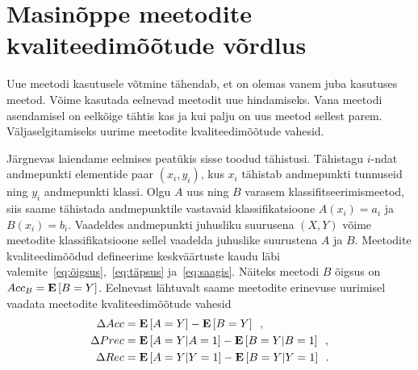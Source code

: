 \section{Masinõppe meetodite kvaliteedimõõtude võrdlus}
Uue meetodi kasutusele võtmine tähendab, et on olemas vanem juba kasutuses meetod. Võime kasutada eelnevad meetodit uue hindamiseks. Vana meetodi asendamisel on eelkõige tähtis kas ja kui palju on uus meetod sellest parem. Väljaselgitamiseks uurime meetodite kvaliteedimõõtude vahesid.

Järgnevas laiendame eelmises peatükis sisse toodud tähistusi. Tähistagu $i$-ndat andmepunkti elementide paar $(x_i, y_i)$, kus $x_i$ tähistab andmepunkti tunnuseid ning $y_i$ andmepunkti klassi. Olgu $A$ uus ning $B$ varasem klassifitseerimismeetod, siis saame tähistada andmepunktile vastavaid klassifikatsioone  $A(x_i) = a_i$ ja $B(x_i) = b_i$. Vaadeldes andmepunkti juhusliku suurusena $(X, Y)$ võime meetodite klassifikatsioone sellel vaadelda juhuslike suurustena $A$ ja $B$. Meetodite kvaliteedimõõdud defineerime keskväärtuste kaudu läbi valemite~\eqref{eq:õigsus},~\eqref{eq:täpsus} ja~\eqref{eq:saagis}. Näiteks meetodi $B$ õigsus on $Acc_B = \operatorname*{\mathbf{E}}\left[B = Y\right]$. Eelnevast lähtuvalt saame meetodite erinevuse uurimisel vaadata meetodite kvaliteedimõõtude vahesid
\begin{align}
    \Delta Acc &= \operatorname*{\mathbf{E}}\left[A = Y\right] - \operatorname*{\mathbf{E}}\left[B = Y\right] \enspace, \label{eq:õigsus vahe} \\
    \Delta Prec &= \operatorname*{\mathbf{E}}\left[A = Y | A = 1\right] - \operatorname*{\mathbf{E}}\left[B = Y | B = 1\right] \enspace, \label{eq:täpsus vahe} \\
    \Delta Rec &= \operatorname*{\mathbf{E}}\left[A = Y | Y = 1\right] - \operatorname*{\mathbf{E}}\left[B = Y | Y = 1\right] \enspace. \label{eq:saagis vahe}
\end{align}

